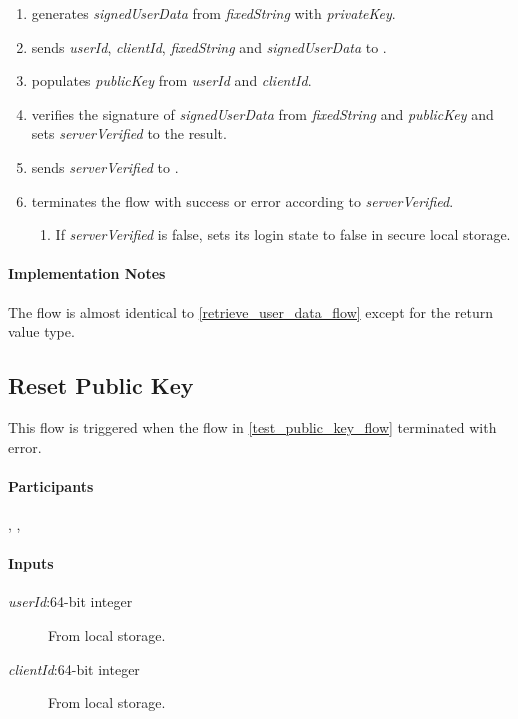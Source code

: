 \documentclass[a4paper,10pt,draft]{article}
\newcommand{\signedUserData}{\emph{signedUserData}}
\newcommand{\serverVerified}{\emph{serverVerified}}
\newcommand{\privateKey}{\emph{privateKey}}
\newcommand{\publicKey}{\emph{publicKey}}
\newcommand{\userId}{\emph{userId}}
\newcommand{\clientId}{\emph{clientId}}
\newcommand{\fixedString}{\emph{fixedString}}
\begin{document}
\begin{enumerate}
 \item \Client{} generates \signedUserData{} from \fixedString{} with 
\privateKey{}.
 \item \Client{} sends \userId{}, \clientId{}, \fixedString{} and 
\signedUserData{} to \Server{}.
 \item \Server{} populates \publicKey{} from \userId{} and \clientId{}.
 \item \Server{} verifies the signature of \signedUserData{} from 
\fixedString{} and \publicKey{} and sets \serverVerified{} to the result.
 \item \Server{} sends \serverVerified{} to \Client{}.
 \item \Client{} terminates the flow with success or error according to 
\serverVerified{}.
 \begin{enumerate}
  \item If \serverVerified{} is false, \Client{} sets its login state to 
false in secure local storage.
 \end{enumerate}
\end{enumerate}

\paragraph{Implementation Notes}
The flow is almost identical to \ref{retrieve_user_data_flow} except for the 
return value type.

\subsection{Reset Public Key}
\label{reset_public_key_flow}
This flow is triggered when the flow in \ref{test_public_key_flow} terminated 
with error.

\paragraph{Participants} \Client{}, \Server{}, \User{}

\paragraph{Inputs}
\SpecialItem
\begin{description}
 \item[\userId{}:64-bit integer] From \Client{} local storage.
 \item[\clientId{}:64-bit integer] From \Client{} local storage.
\end{description}
\end{document}
